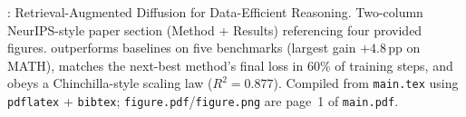 \caption{\textbf{\methodname}: Retrieval-Augmented Diffusion for Data-Efficient Reasoning.
Two-column NeurIPS-style paper section (Method + Results) referencing four provided figures.
\methodname{} outperforms baselines on five benchmarks (largest gain $+4.8\,\text{pp}$ on MATH),
matches the next-best method's final loss in 60\% of training steps, and obeys a
Chinchilla-style scaling law ($R^{2}=0.877$).
Compiled from \texttt{main.tex} using \texttt{pdflatex} + \texttt{bibtex};
\texttt{figure.pdf}/\texttt{figure.png} are page~1 of \texttt{main.pdf}.}
